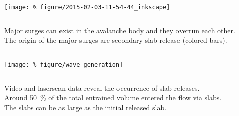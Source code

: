 \documentclass[unknownkeysallowed,usepdftitle=false]{beamer}
\newcommand{\secvariable}{nothing}
\newcommand{\mysection}[1]{\renewcommand{\secvariable}{#1}
}
\begin{document}
\mysection{major}
\begin{frame}\label{\secvariable} %
\begin{center}
\texttt{[image: \%
figure/2015-02-03-11-54-44\_inkscape]}
\end{center}
\begin{columns}
\begin{column}[t]{1.1\textwidth}
 Major surges can exist in the avalanche body and they overrun each other.\\
 The origin of the major surges are secondary slab release (colored bars).
\end{column}
\end{columns}
\end{frame}

\mysection{slab}
\begin{frame}\label{\secvariable}
\texttt{[image: \%
figure/wave\_generation]}
\begin{columns}
\begin{column}[t]{1.1\textwidth}
 Video and laserscan data reveal the occurrence of slab releases.\\
 Around \SI{50}{\percent} of the total entrained volume entered the flow via
slabs.\\
  The slabs can be as large as the initial released slab.
\hyperlink{slabtable}{}
\end{column}
\end{columns}
\end{frame}
\end{document}
